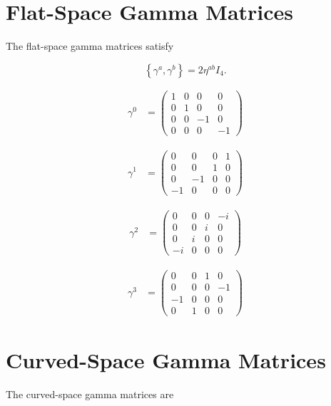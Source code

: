 \documentclass[12pt,fleqn]{article}
\begin{document}
\section*{Flat-Space Gamma Matrices}

The flat-space gamma matrices satisfy

\[
\left\{
\gamma^a,
\gamma^b
\right\}
=
2\eta^{ab}I_4 .
\]

\[
\begin{aligned}
\gamma^{0} &=
\begin{pmatrix}
1 & 0 & 0 & 0 \\
0 & 1 & 0 & 0 \\
0 & 0 & -1 & 0 \\
0 & 0 & 0 & -1
\end{pmatrix}
\end{aligned}
\]

\[
\begin{aligned}
\gamma^{1} &=
\begin{pmatrix}
0 & 0 & 0 & 1 \\
0 & 0 & 1 & 0 \\
0 & -1 & 0 & 0 \\
-1 & 0 & 0 & 0
\end{pmatrix}
\end{aligned}
\]

\[
\begin{aligned}
\gamma^{2} &=
\begin{pmatrix}
0 & 0 & 0 & - i \\
0 & 0 & i & 0 \\
0 & i & 0 & 0 \\
- i & 0 & 0 & 0
\end{pmatrix}
\end{aligned}
\]

\[
\begin{aligned}
\gamma^{3} &=
\begin{pmatrix}
0 & 0 & 1 & 0 \\
0 & 0 & 0 & -1 \\
-1 & 0 & 0 & 0 \\
0 & 1 & 0 & 0
\end{pmatrix}
\end{aligned}
\]

\section*{Curved-Space Gamma Matrices}

The curved-space gamma matrices are
\end{document}
